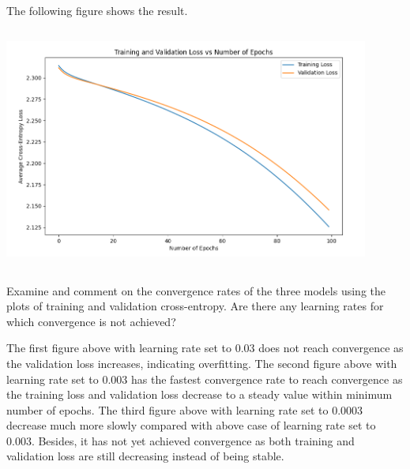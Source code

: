 \documentclass[11pt,addpoints,answers]{exam}
\begin{document}
\begin{questions}
\begin{parts}
\begin{subparts}
\begin{your_solution}[title=Plot LR 0.0003,height=10cm,width=14.5cm]
The following figure shows the result.
\newline
\begin{minipage}{1\linewidth}
	\centering
	\includegraphics[width=12cm, height=8cm]{../Q3_2_res_0.0003.png}
	\label{fig:Q3_3_res_0.0003}         %
\end{minipage}
\end{your_solution}

\clearpage

\subpart[1] Examine and comment on the convergence rates of the three models using the plots of training and validation cross-entropy. Are there any learning rates for which convergence is not achieved?

\begin{your_solution}[title=Answer,height=5cm,width=14.5cm]
\small
The first figure above with learning rate set to 0.03 does not reach convergence as the validation loss increases, indicating overfitting. \newline
The second figure above with learning rate set to 0.003 has the fastest convergence rate to reach convergence as the training loss and validation loss decrease to a steady value within minimum number of epochs.\newline
The third figure above with learning rate set to 0.0003 decrease much more slowly compared with above case of learning rate set to 0.003. Besides, it has not yet achieved convergence as both training and validation loss are still decreasing instead of being stable.
\end{your_solution}


\end{subparts}
\end{parts}
\end{questions}
\end{document}
